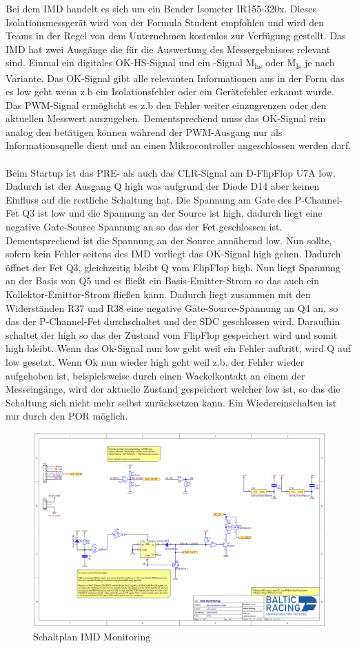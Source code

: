 Bei dem \ac{IMD} handelt es sich um ein Bender Isometer IR155-320x. Dieses Isolationsmessgerät wird von der Formula Student empfohlen und wird den Teams in der Regel von dem Unternehmen kostenlos zur Verfügung gestellt.
Das \ac{IMD} hat zwei Ausgänge die für die Auswertung des Messergebnisses relevant sind. Einmal ein digitales OK-HS-Signal und ein -Signal M\textsubscript{hs} oder M\textsubscript{ls} je nach Variante. Das OK-Signal gibt alle relevanten Informationen aus in der Form das es low geht wenn z.b ein Isolationsfehler oder ein Gerätefehler erkannt wurde. Das \ac{PWM}-Signal ermöglicht es z.b den Fehler weiter einzugrenzen oder den aktuellen Messwert auszugeben. Dementsprechend muss das OK-Signal rein analog den  betätigen können während der \ac{PWM}-Ausgang nur als Informationsquelle  dient und an einen Mikrocontroller angeschlossen werden darf. 
\\
\\
Beim Startup ist das PRE- als auch das CLR-Signal am D-FlipFlop U7A low. Dadurch ist der Ausgang Q high was aufgrund der Diode D14 aber keinen Einfluss auf die restliche Schaltung hat. Die Spannung am Gate des P-Channel-Fet Q3 ist low und die Spannung an der Source ist high, dadurch liegt eine negative Gate-Source Spannung an so das der Fet geschlossen ist. Dementsprechend ist die Spannung an der Source annähernd low. Nun sollte, sofern kein Fehler seitens des \ac{IMD} vorliegt das OK-Signal high gehen. Dadurch öffnet der Fet Q3, gleichzeitig bleibt Q vom FlipFlop high. Nun liegt Spannung an der Basis von Q5 und es fließt ein Basis-Emitter-Strom so das auch ein Kollektor-Emittor-Strom fließen kann. Dadurch liegt zusammen mit den Widerständen R37 und R38 eine negative Gate-Source-Spannung an Q4 an, so das der P-Channel-Fet durchschaltet und der \ac{SDC} geschlossen wird. Daraufhin schaltet der  high so das der Zustand vom FlipFlop gespeichert wird und somit high bleibt. Wenn das Ok-Signal nun low geht weil ein Fehler auftritt, wird Q auf low gesetzt. Wenn Ok nun wieder high geht weil z.b. der Fehler wieder aufgehoben ist, beispielsweise durch einen Wackelkontakt an einem der Messeingänge, wird der aktuelle Zustand gespeichert welcher low ist, so das die Schaltung sich nicht mehr selbst zurücksetzen kann. Ein Wiedereinschalten ist nur durch den \ac{POR} möglich.

\begin{figure}
	\centering
	\includegraphics[width=0.7\linewidth]{"bilder/IMD Monitoring schematic"}
	\caption{Schaltplan IMD Monitoring}
	\label{fig:imd-monitoring-schematic}
\end{figure}



